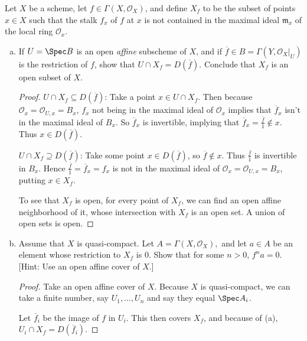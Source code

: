 \begin{exercise}%
Let $X $ be a scheme, let $f\in \Gamma(X,\mathscr{O}_X)$, and define $X_f $ to be the subset of points $x\in X $ such that the stalk $f_x $ of $f $ at $x $ is not contained in the maximal ideal $\mathfrak{m}_x$ of the local ring $\mathscr{O}_x $.
\begin{enumerate}[(a)]
	\item If $U = \Spec B$ is an open \textit{affine} subscheme of $X $, and if $\overline{f} \in B = \Gamma(Y,\mathscr{O}_X|_U)  $ is the restriction of $f $, show that $U\cap X_f = D(\overline{f})  $. Conclude that $X_f $ is an open subset of $X $.
	\begin{proof}
		$U\cap X_f \subseteq D(\overline{f})  $: Take a point $x\in U\cap X_f $.
		Then because $\mathscr{O}_x = \mathscr{O}_{U,x} = B_x $, $f_x $ not being in the maximal ideal of $\mathscr{O}_x$ implies that $\overline{f}_x  $ isn't in the maximal ideal of $B_x $.
		So $\overline{f}_x  $ is invertible, implying that $\overline{f}_x = \frac{\overline{f}}{1}  \notin x  $.
		Thus $x\in D(\overline{f})  $.

		$U\cap X_f \supseteq D(\overline{f})  $:
		Take some point $x\in D(\overline{f})  $, so $\overline{f}\not\in x$.
		Thus $\frac{\overline{f}}{1}$ is invertible in $B_x $.
		Hence $\frac{\overline{f} }{1} = \overline{f}_x = f_x$ is not in the maximal ideal of $\mathscr{O}_x = \mathscr{O}_{U,x} = B_x $, putting $x \in X_f $.

		To see that $X_f $ is open, for every point of $X_f $, we can find an open affine neighborhood of it, whose intersection with $X_f $ is an open set.
		A union of open sets is open.
	\end{proof}
	\item Assume that $X $ is quasi-compact. Let $A = \Gamma(X,\mathscr{O}_X), $ and let $a\in A $ be an element whose restriction to $X_f $ is $0 $. Show that for some $n > 0 $, $f^na = 0 $.
		[Hint: Use an open affine cover of $X $.]
	\begin{proof}
		Take an open affine cover of $X $.
		Because $X $ is quasi-compact, we can take a finite number, say $U_{1}, \ldots ,U_n $ and say they equal $\Spec A_i $.

		Let $\overline{f}_i  $ be the image of $f $ in $U_i $.
		This then covers $X_f $, and because of (a), $U_i \cap X_f = D(\overline{f}_i)  $.


\end{proof}
\end{enumerate}
\end{exercise}
